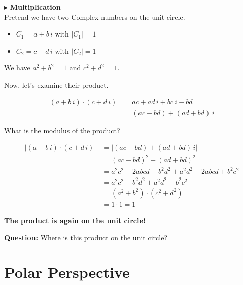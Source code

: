 \documentclass{ximera}
\begin{document}
$\blacktriangleright$ \textbf{Multiplication} \\


Pretend we have two Complex numbers on the unit circle.

\begin{itemize}
\item $C_1 = a + b \, i$ with $|C_1| = 1$
\item $C_2 = c + d \, i$ with $|C_2| = 1$
\end{itemize}



We have $a^2 + b^2 = 1$  and $c^2 + d^2 = 1$.



Now, let's examine their product.






\begin{align*}
(a + b \, i) \cdot (c + d \, i)      & = ac + ad \, i + bc \, i - bd   \\
                & = (ac - bd) + (ad + bd) \, i
\end{align*}



What is the modulus of the product?





\begin{align*}
|(a + b \, i) \cdot (c + d \, i)|      & = | (ac - bd) + (ad + bd) \, i | \\
                & = (ac - bd)^2 + (ad + bd)^2   \\
                & = a^2c^2 - 2abcd + b^2d^2 + a^2d^2 + 2abcd + b^2c^2  \\
                & = a^2c^2 + b^2d^2 + a^2d^2 + b^2c^2  \\
                & = (a^2 + b^2) \cdot (c^2 + d^2)   \\
                & = 1 \cdot 1 = 1
\end{align*}



\textbf{\textcolor{purple!85!blue}{The product is again on the unit circle!}}





\textbf{Question:} Where is this product on the unit circle?




\section{Polar Perspective}
\end{document}
